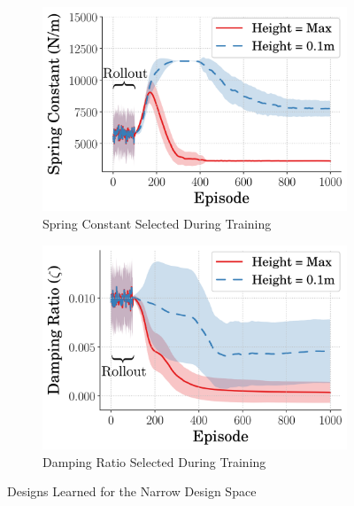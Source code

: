 %  
\begin{figure}[tb!]
        \centering
        \begin{subfigure}{.49\textwidth}
                \centering
                \includegraphics[width=\textwidth]{figures/Ch4/design_space_narr/SpringVsTime.png}  
                \caption{Spring Constant Selected During Training}
                \label{fig:spring_v_step_narr}
        \end{subfigure}%
        \hfill
        \begin{subfigure}{.49\textwidth}
                \centering
                \includegraphics[width=\textwidth]{figures/Ch4/design_space_narr/ZetaVsTime.png}  
                \caption{Damping Ratio Selected During Training}
                \label{fig:zeta_v_step_narr}
        \end{subfigure}
         \caption{Designs Learned for the Narrow Design Space}
         \label{fig:des_vs_step_narr}
\end{figure}
% 

